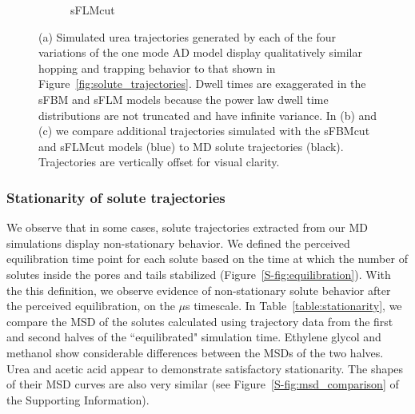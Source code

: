 \documentclass[aps,pre,preprint,groupedaddress]{revtex4-2}
\begin{document}
\begin{figure}
\begin{subfigure}{0.325\textwidth}
  \caption{sFLMcut}\label{fig:ad_realizations_sFLMcut_stacked}
  \end{subfigure}
  \caption{(a) Simulated urea trajectories generated by each of the four variations of 
  the one mode AD model display qualitatively similar hopping and trapping behavior to
  that shown in Figure~\ref{fig:solute_trajectories}. Dwell times are exaggerated in 
  the sFBM and sFLM models because the power law dwell time distributions are not 
  truncated and have infinite variance. In (b) and (c) we compare additional 
  trajectories simulated with the sFBMcut and sFLMcut models (blue) to
  MD solute trajectories (black). Trajectories are vertically offset for visual clarity.
  }\label{fig:ad_eyetest}
  \end{figure}
    
  
  \subsubsection{Stationarity of solute trajectories}\label{section:stationarity}
  
  
  We observe that in some cases, solute trajectories extracted from our MD simulations
  display non-stationary behavior. We defined the perceived equilibration time point for
  each solute based on the time at which the number of solutes inside the pores and tails
  stabilized (Figure~\ref{S-fig:equilibration}). 
  With the this definition,
  we observe evidence of 
  non-stationary solute behavior after the perceived equilibration, on the $\mu$s 
  timescale. In Table~\ref{table:stationarity}, we compare the MSD of the solutes 
  calculated using trajectory data from the first and second halves of the 
  ``equilibrated" simulation time. Ethylene glycol and methanol show considerable 
  differences between the MSDs of the two halves. Urea and acetic acid appear to demonstrate satisfactory
  stationarity. The shapes of their MSD curves are also very similar (see 
  Figure~\ref{S-fig:msd_comparison} of the Supporting Information).
  
\end{document}

